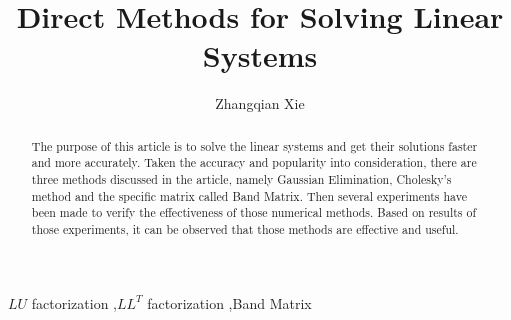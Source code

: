 \documentclass[preprint,12pt]{elsarticle}
\begin{document}
\begin{frontmatter}


\title{Direct Methods for Solving Linear Systems}




\author{Zhangqian Xie}

\address{No.201600020098, Shandong University}

\begin{abstract}
The purpose of this article is to solve the linear systems and get their solutions faster and more accurately. Taken the accuracy and popularity into consideration, there are three methods discussed in the article, namely Gaussian Elimination, Cholesky's method and the specific matrix called Band Matrix. Then several experiments have been made to verify the effectiveness of those numerical methods. Based on results of those experiments, it can be observed that those methods are effective and useful.
\end{abstract}

\begin{keyword}
$LU$ factorization \sep $LL^T$ factorization \sep Band Matrix


\end{keyword}

\end{frontmatter}
\end{document}

